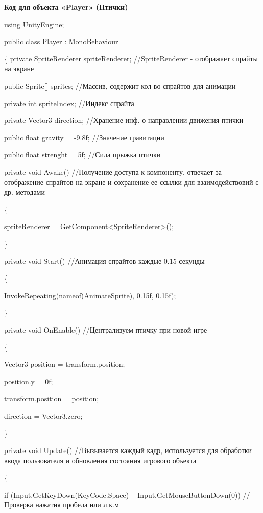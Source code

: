 \documentclass[14pt, oneside]{altsu-report}
\begin{document}
\begin{center}
\label{code:appendix}\textbf{Код для объекта «Player» (Птички)} 
\end{center}

using UnityEngine; 

public class Player : MonoBehaviour 

\{
    private SpriteRenderer spriteRenderer; //SpriteRenderer - отображает спрайты на экране

    public Sprite[] sprites; //Массив, содержит кол-во спрайтов для анимации

    private int spriteIndex; //Индекс спрайта

    private Vector3 direction; //Хранение инф. о направлении движения птички

    public float gravity = -9.8f; //Значение гравитации

    public float strenght = 5f; //Сила прыжка птички

    private void Awake() //Получение доступа к компоненту, отвечает за отображение спрайтов на экране и сохранение ее ссылки для взаимодействовий с др. методами

    \{

        spriteRenderer = GetComponent<SpriteRenderer>();

    \}

    private void Start() //Анимация спрайтов каждые 0.15 секунды

    \{

        InvokeRepeating(nameof(AnimateSprite), 0.15f, 0.15f);

    \}

    private void OnEnable() //Централизуем птичку при новой игре

    \{

        Vector3 position = transform.position;

        position.y = 0f; 

        transform.position = position;

        direction = Vector3.zero; 

    \}

    private void Update() //Вызывается каждый кадр, используется для обработки ввода пользователя и обновления состояния игрового объекта

    \{
       
        if (Input.GetKeyDown(KeyCode.Space) || Input.GetMouseButtonDown(0)) //Проверка нажатия пробела или л.к.м
\end{document}
